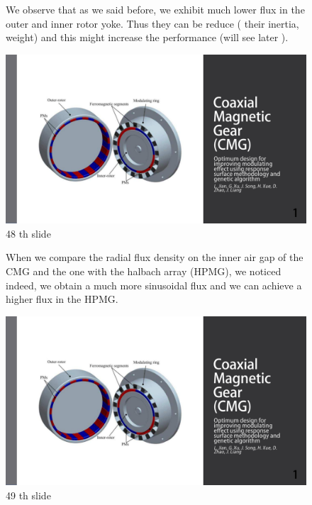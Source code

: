 \begin{figure}[H]
    \begin{minipage}{.45\linewidth}
    We observe that as we said before, we exhibit much lower flux in the outer and inner rotor yoke. Thus they can be reduce ( their inertia, weight) and this might increase the performance (will see later ).
    \end{minipage}
    \hfill%
    \begin{minipage}[c]{.45\linewidth}
        \centering
        \includegraphics[page={48},width=\textwidth]{LELEC2311.allow.pdf}
        \caption{48 th slide}
    \end{minipage}
\end{figure}

\begin{figure}[H]
    \begin{minipage}{.45\linewidth}
   When we compare the radial flux density on the inner air gap of the CMG and the one with the halbach array (HPMG), we noticed indeed, we obtain a much more sinusoidal flux and we can achieve a higher flux in the HPMG.
    \end{minipage}
    \hfill%
    \begin{minipage}[c]{.45\linewidth}
        \centering
        \includegraphics[page={49},width=\textwidth]{LELEC2311.allow.pdf}
        \caption{49 th slide}
    \end{minipage}
\end{figure}


